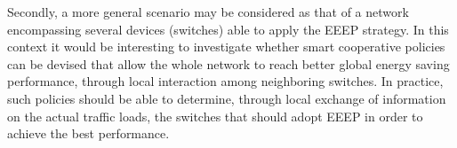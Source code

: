 \documentclass[journal,10pt,twoside,final]{IEEEtran}
\begin{document}
Secondly, a more general scenario may be considered as that of a network encompassing several devices (switches) able to apply the EEEP strategy. In this context it would be interesting to investigate whether smart cooperative policies can be devised that allow the whole network to reach better global energy saving performance, through local interaction among neighboring switches. In practice, such policies should be able to determine, through local exchange of information on the actual traffic loads, the switches that should adopt EEEP in order to achieve the best performance. 




\end{document}
